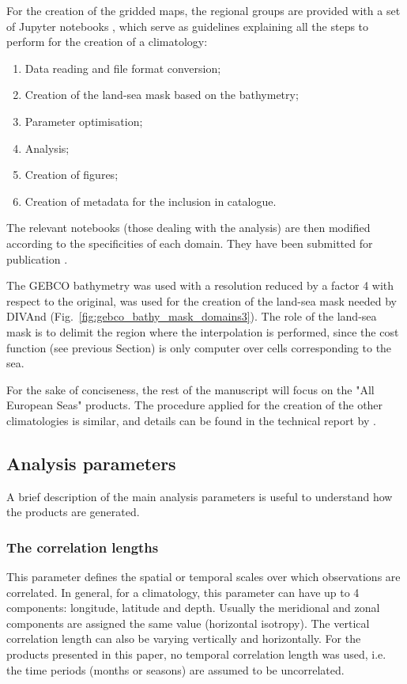 \documentclass[essd,manuscript]{copernicus}
\begin{document}
For the creation of the gridded maps, the regional groups are provided with a set of Jupyter notebooks \citep[https://jupyter.org][]{KLUYVER2016}, which serve as guidelines explaining all the steps to perform for the creation of a climatology:
\begin{enumerate}
\item Data reading and file format conversion;
\item Creation of the land-sea mask based on the bathymetry;
\item Parameter optimisation;
\item Analysis;
\item Creation of figures;
\item Creation of metadata for the inclusion in catalogue.
\end{enumerate}
The relevant notebooks (those dealing with the analysis) are then modified according to the specificities of each domain. They have been submitted for publication \citep{TROUPIN2025}.

The GEBCO bathymetry \citep[2021 grid,][]{GEBCO2021} was used with a resolution reduced by a factor 4 with respect to the original, was used for the creation of the land-sea mask
needed by DIVAnd (Fig.~\ref{fig:gebco_bathy_mask_domains3}). The role of the land-sea mask is to delimit the region where the interpolation is performed, since the cost function (see previous Section) is only computer over cells corresponding to the sea. 

For the sake of conciseness, the rest of the manuscript will focus on the "All European Seas" products. The procedure applied for the creation of the other climatologies is similar, and details can be found in the technical report by \citep{BUGA2021}.

\subsection{Analysis parameters}

A brief description of the main analysis parameters is useful to understand how the products are generated.

\subsubsection{The correlation lengths}

This parameter defines the spatial or temporal scales  over which observations are correlated. In general, for a climatology, this parameter can have up to 4 components: longitude, latitude and depth. Usually the meridional and zonal components are assigned the same value (horizontal isotropy). The vertical correlation length can also be varying vertically and horizontally. For the products presented in this paper, no temporal correlation length was used, i.e. the time periods (months or seasons) are assumed to be uncorrelated. 
\end{document}
